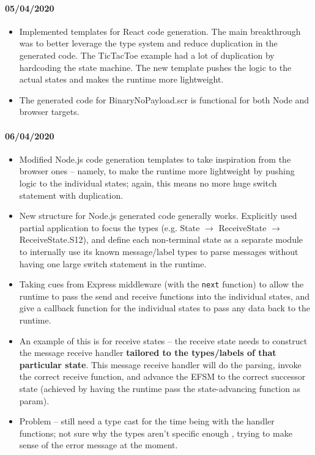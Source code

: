 \documentclass{article}
\begin{document}
\paragraph{05/04/2020}
\begin{itemize}
\item
Implemented templates for React code generation.
The main breakthrough was to better leverage
the type system and reduce duplication in the
generated code. The TicTacToe example had a lot
of duplication by hardcoding the state machine.
The new template pushes the logic to the actual
states and makes the runtime more lightweight.

\item
The generated code for BinaryNoPayload.scr is functional for both Node and browser targets.
\end{itemize}

\paragraph{06/04/2020}
\begin{itemize}
\item
Modified Node.js code generation templates to
take inspiration from the browser ones -- namely,
to make the runtime more lightweight by pushing
logic to the individual states; again, this means
no more huge switch statement with duplication.

\item
New structure for Node.js generated code generally
works. Explicitly used partial application to
focus the types (e.g. State $\to$ ReceiveState $\to$
ReceiveState.S12), and define each non-terminal
state as a separate module to internally use
its known message/label types to parse messages
without having one large switch statement in the
runtime. 

\item
Taking cues from Express middleware (with
the \texttt{next} function) to allow the
runtime to pass the send and receive functions
into the individual states, and give a callback
function for the individual states to pass any
data back to the runtime. 

\item
An example of this is for receive states -- 
the receive state needs to construct the message 
receive handler \textbf{tailored to the types/labels of 
that particular state}. This message receive handler
will do the parsing, invoke the correct receive
function, and advance the EFSM to the correct
successor state (achieved by having the runtime
pass the state-advancing function as param).

\item
Problem -- still need a type cast for the time being
with the handler functions; not sure why the types
aren't specific enough , trying to make sense of the 
error message at the moment.
\end{itemize}
\end{document}
